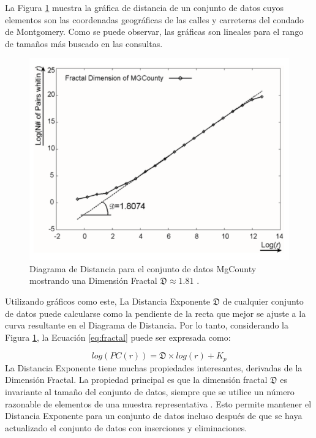     La Figura \ref{fig:mgcounty} muestra la gráfica de distancia de un conjunto de datos cuyos elementos son las coordenadas geográficas de las calles y carreteras del condado de Montgomery. Como se puede observar, las gráficas son lineales para el rango de tamaños más buscado en las consultas.  
\begin{figure}[h]
\centering
\includegraphics[scale=0.4]{chapter4/mgcounty.png}
\caption{Diagrama de Distancia para el conjunto de datos MgCounty mostrando una Dimensión Fractal $\mathfrak{D} \approx 1.81$ .}
\label{fig:mgcounty}
\end{figure}
	Utilizando gráficos como este, La Distancia Exponente $\mathfrak{D}$ de cualquier conjunto de datos puede calcularse como la pendiente de la recta que mejor se ajuste a la curva resultante en el Diagrama de Distancia. Por lo tanto, considerando la Figura \ref{fig:mgcounty}, la Ecuación \ref{eq:fractal} puede ser expresada como:
	
	\begin{equation}\label{eq:logpc_fractal}
	   log(PC(r)) = \mathfrak{D} \times log (r) + K_p 		
	\end{equation}
		La Distancia Exponente tiene muchas propiedades interesantes, derivadas de   la Dimensión Fractal. La propiedad principal es que la   dimensión fractal $\mathfrak{D}$ es invariante al tamaño del conjunto de datos, siempre que se utilice un número razonable de elementos de una muestra representativa  \cite{Faloutsos:2000:SJS:335191.335412}. Esto permite mantener el Distancia Exponente    para un conjunto de datos incluso después de que se haya actualizado el conjunto de datos con inserciones y eliminaciones.


